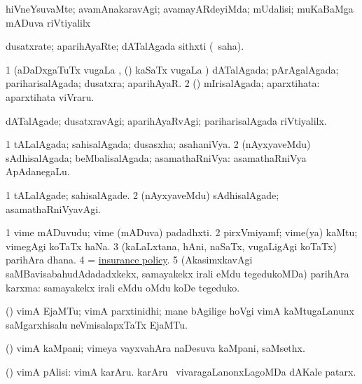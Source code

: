 \bentry
{}
\gl{\kirxvi}
\bmng
hiVneYsuvaMte; avamAnakaravAgi; avamayARdeyiMda; mUdalisi; muKaBaMga mADuva riVtiyalilx 
\emng
\eentry

\bentry
{}
\gl{\nA}
\bmng
dusatxrate; aparihAyaRte; dATalAgada sithxti (\rUpa\ saha). 
\emng
\eentry

\bentry
{}
\gl{\gu}
\bmng
\bnum
\num{1} (aDaDxgaTuTx \mo vugaLa \vi, (\rUpa) kaSaTx \mo vugaLa \vi) dATalAgada; pArAgalAgada; pariharisalAgada; dusatxra; aparihAyaR. 
\num{2} (\viparx) mIrisalAgada; aparxtihata:  aparxtihata viVraru. 
\enum
\emng
\eentry

\bentry
{}
\gl{\kirxvi}
\bmng
dATalAgade; dusatxravAgi; aparihAyaRvAgi; pariharisalAgada riVtiyalilx. 
\emng
\eentry

\bentry
{}
\gl{\gu}
\bmng
\bnum
\num{1} tALalAgada; sahisalAgada; dusasxha; asahaniVya. 
\num{2} (nAyxyaveMdu) sAdhisalAgada; beMbalisalAgada; asamathaRniVya:  asamathaRniVya ApAdanegaLu. 
\enum
\emng
\eentry

\bentry
{}
\gl{\kirxvi}
\bmng
\bnum
\num{1} tALalAgade; sahisalAgade. 
\num{2} (nAyxyaveMdu) sAdhisalAgade; asamathaRniVyavAgi. 
\enum
\emng
\eentry

\bentry
{}
\gl{\nA}
\bmng
\bnum
\num{1} vime mADuvudu; vime (mADuva) padadhxti. 
\num{2} pirxVmiyamf; vime(ya) kaMtu; vimegAgi koTaTx haNa. 
\num{3} (kaLaLxtana, hAni, naSaTx, \mo vugaLigAgi koTaTx) parihAra dhana. 
\num{4} = \hyperlink{insurance policy}{insurance policy}. 
\num{5} (AkasimxkavAgi saMBavisabahudAdadadxkekx, samayakekx irali eMdu tegedukoMDa) parihAra karxma:  samayakekx irali eMdu oMdu koDe tegeduko. 
\enum
\emng
\eentry

\bentry
{}
\gl{\nA}
\bmng
(\birx) vimA EjaMTu; vimA parxtinidhi; mane bAgilige hoVgi vimA kaMtugaLanunx saMgarxhisalu neVmisalapxTaTx EjaMTu. 
\emng
\eentry

\bentry
{}
\gl{\nA}
\bmng
(\birx) vimA kaMpani; vimeya vayxvahAra naDesuva kaMpani, saMsethx. 
\emng
\eentry

\bentry
{}
\gl{\nA}
\bmng
(\birx) vimA pAlisi: 
\banum
{} vimA karAru. 
 karAru \mo\ vivaragaLanonxLagoMDa dAKale patarx. 
\eanum
\emng
\eentry


